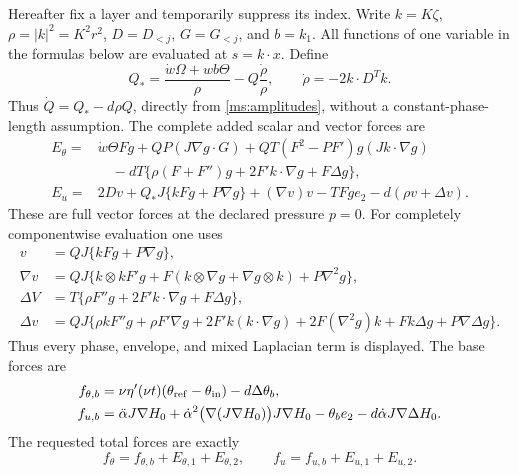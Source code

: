 Hereafter fix a layer and temporarily suppress its index. Write
$k=K\zeta$, $\rho=|k|^2=K^2r^2$, $D=D_{<j}$, $G=G_{<j}$,
and $b=k_1$. All functions of one variable in the formulas below
are evaluated at $s=k\cdot x$. Define
\begin{equation}\label{ms:Qrest}
 Q_* =\frac{\dot w\Omega+wb\Theta}{\rho}
                         -Q\frac{\dot\rho}{\rho},
 \qquad\dot\rho=-2k\cdot D^Tk.
\end{equation}
Thus $\dot Q=Q_*-d\rho Q$, directly from
\eqref{ms:amplitudes}, without a constant-phase-length assumption.
The complete added scalar and vector forces are
\begin{align}
 E_\theta={}&\dot w\Theta Fg+QP(J\nabla g\cdot G)
       +QT(F^2-PF')g(Jk\cdot\nabla g)\nonumber\\
 &\quad-dT\{\rho(F+F'')g+2F'k\cdot\nabla g+F\Delta g\},
 \label{ms:scalar}\\
 E_u={}&2Dv+Q_*J\{kFg+P\nabla g\}
                         +(\nabla v)v-TFg e_2
                         -d(\rho v+\Delta v).
 \label{ms:vector}
\end{align}
These are full vector forces at the declared pressure $p=0$.
For completely componentwise evaluation one uses
\begin{align}
 v&=QJ\{kFg+P\nabla g\},\nonumber\\
 \nabla v&=QJ\{k\otimes k F'g+
           F(k\otimes\nabla g+\nabla g\otimes k)+P\nabla^2g\},
 \label{ms:velocityjets}\\
 \Delta V&=T\{\rho F''g+2F'k\cdot\nabla g+F\Delta g\},
 \label{ms:lapscalar}\\
 \Delta v&=QJ\{\rho kF''g+\rho F'\nabla g
       +2F'k(k\cdot\nabla g)+2F(\nabla^2g)k
                         +Fk\Delta g+P\nabla\Delta g\}.
 \label{ms:lapvector}
\end{align}
Thus every phase, envelope, and mixed Laplacian term is displayed.
The base forces are
\begin{align}
 f_{\theta,b}&=\nu\eta'(\nu t)
                 (\theta_{\rm ref}-\theta_{\rm in})-d\Delta\theta_b,
 \nonumber\\
 f_{u,b}&=\ddot\alpha J\nabla H_0+
        \dot\alpha^2\bigl(\nabla(J\nabla H_0)\bigr)J\nabla H_0
                          -\theta_b e_2-d\dot\alpha J\nabla\Delta H_0.
 \label{ms:baseforce}
\end{align}
The requested total forces are exactly
\begin{equation}\label{ms:totalforce}
 f_\theta=f_{\theta,b}+E_{\theta,1}+E_{\theta,2},
 \qquad f_u=f_{u,b}+E_{u,1}+E_{u,2}.
\end{equation}

